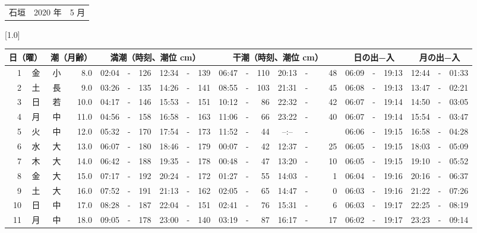 \documentclass[12pt,a4j]{jsarticle}
\begin{document}
 \begin{table}[htbp]
 \begin{center}
 \begin{tabular}{lcc}
 \LARGE{石垣}  & \large{2020 年} & \large{ 5 月} \\
 \end{tabular}
 \end{center}
 \begin{center}
    \scalebox{0.7}[1.0]{
    \begin{tabular}{|rc|cr|ccrccr|ccrccr|ccc|ccc|}
    \hline
    \multicolumn{2}{|c|}{日（曜）} & \multicolumn{2}{c|}{潮（月齢）} & \multicolumn{6}{c|}{満潮（時刻、潮位 cm）} & \multicolumn{6}{c|}{干潮（時刻、潮位 cm）} & \multicolumn{3}{c|}{日の出−入} &  \multicolumn{3}{c|}{月の出−入}\\
 \hline
 1 & 金 & 小 &  8.0 &  02:04 &-& 126 &  12:34 &-& 139 &  06:47 &-& 110 &  20:13 &-&  48 & 06:09 & -& 19:13 & 12:44 & -& 01:33 \\
 2 & 土 & 長 &  9.0 &  03:26 &-& 135 &  14:26 &-& 141 &  08:55 &-& 103 &  21:31 &-&  45 & 06:08 & -& 19:13 & 13:47 & -& 02:21 \\
 3 & 日 & 若 & 10.0 &  04:17 &-& 146 &  15:53 &-& 151 &  10:12 &-&  86 &  22:32 &-&  42 & 06:07 & -& 19:14 & 14:50 & -& 03:05 \\
 4 & 月 & 中 & 11.0 &  04:56 &-& 158 &  16:58 &-& 163 &  11:06 &-&  66 &  23:22 &-&  40 & 06:07 & -& 19:14 & 15:54 & -& 03:47 \\
 5 & 火 & 中 & 12.0 &  05:32 &-& 170 &  17:54 &-& 173 &  11:52 &-&  44 &  --:-- &-&~~~~~ & 06:06 & -& 19:15 & 16:58 & -& 04:28 \\
 6 & 水 & 大 & 13.0 &  06:07 &-& 180 &  18:46 &-& 179 &  00:07 &-&  42 &  12:37 &-&  25 & 06:05 & -& 19:15 & 18:03 & -& 05:09 \\
 7 & 木 & 大 & 14.0 &  06:42 &-& 188 &  19:35 &-& 178 &  00:48 &-&  47 &  13:20 &-&  10 & 06:05 & -& 19:15 & 19:10 & -& 05:52 \\
 8 & 金 & 大 & 15.0 &  07:17 &-& 192 &  20:24 &-& 172 &  01:27 &-&  55 &  14:03 &-&   1 & 06:04 & -& 19:16 & 20:16 & -& 06:37 \\
 9 & 土 & 大 & 16.0 &  07:52 &-& 191 &  21:13 &-& 162 &  02:05 &-&  65 &  14:47 &-&   0 & 06:03 & -& 19:16 & 21:22 & -& 07:26 \\
10 & 日 & 中 & 17.0 &  08:28 &-& 187 &  22:04 &-& 151 &  02:41 &-&  76 &  15:31 &-&   6 & 06:03 & -& 19:17 & 22:25 & -& 08:19 \\
11 & 月 & 中 & 18.0 &  09:05 &-& 178 &  23:00 &-& 140 &  03:19 &-&  87 &  16:17 &-&  17 & 06:02 & -& 19:17 & 23:23 & -& 09:14 \\

\end{tabular}}
\end{center}
\end{table}
\end{document}
